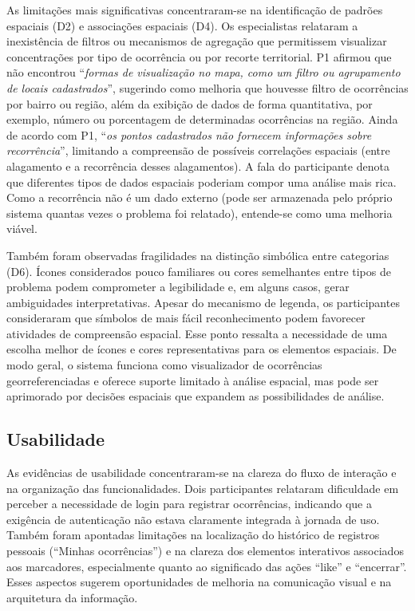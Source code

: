 \documentclass[12pt]{article}
\begin{document}
As limitações mais significativas concentraram-se na identificação de padrões espaciais (D2) e associações espaciais (D4). Os especialistas relataram a inexistência de filtros ou mecanismos de agregação que permitissem visualizar concentrações por tipo de ocorrência ou por recorte territorial. P1 afirmou que não encontrou “\textit{formas de visualização no mapa, como um filtro ou agrupamento de locais cadastrados}”, sugerindo como melhoria que houvesse filtro de ocorrências por bairro ou região, além da exibição de dados de forma quantitativa, por exemplo, número ou porcentagem de determinadas ocorrências na região. Ainda de acordo com P1, “\textit{os pontos cadastrados não fornecem informações sobre recorrência}”, limitando a compreensão de possíveis correlações espaciais (entre alagamento e a recorrência desses alagamentos). A fala do participante denota que diferentes tipos de dados espaciais poderiam compor uma análise mais rica. Como a recorrência não é um dado externo (pode ser armazenada pelo próprio sistema quantas vezes o problema foi relatado), entende-se como uma melhoria viável.

Também foram observadas fragilidades na distinção simbólica entre categorias (D6). Ícones considerados pouco familiares ou cores semelhantes entre tipos de problema podem comprometer a legibilidade e, em alguns casos, gerar ambiguidades interpretativas. Apesar do mecanismo de legenda, os participantes consideraram que símbolos de mais fácil reconhecimento podem favorecer atividades de compreensão espacial. Esse ponto ressalta a necessidade de uma escolha melhor de ícones e cores representativas para os elementos espaciais. De modo geral, o sistema funciona como visualizador de ocorrências georreferenciadas e oferece suporte limitado à análise espacial, mas pode ser aprimorado por decisões espaciais que expandem as possibilidades de análise.

\subsection{Usabilidade}
As evidências de usabilidade concentraram-se na clareza do fluxo de interação e na organização das funcionalidades. Dois participantes relataram dificuldade em perceber a necessidade de login para registrar ocorrências, indicando que a exigência de autenticação não estava claramente integrada à jornada de uso. Também foram apontadas limitações na localização do histórico de registros pessoais (“Minhas ocorrências”) e na clareza dos elementos interativos associados aos marcadores, especialmente quanto ao significado das ações “like” e “encerrar”. Esses aspectos sugerem oportunidades de melhoria na comunicação visual e na arquitetura da informação.
\end{document}
